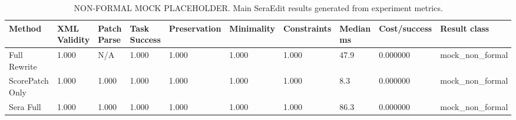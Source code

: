 \begin{table}[t]
\centering
\caption{NON-FORMAL MOCK PLACEHOLDER. Main SeraEdit results generated from experiment metrics.}
\small
\begin{tabular}{llllllllll}
\hline
Method & XML Validity & Patch Parse & Task Success & Preservation & Minimality & Constraints & Median ms & Cost/success & Result class \\
\hline
Full Rewrite & 1.000 & N/A & 1.000 & 1.000 & 1.000 & 1.000 & 47.9 & 0.000000 & mock\_non\_formal \\
ScorePatch Only & 1.000 & 1.000 & 1.000 & 1.000 & 1.000 & 1.000 & 8.3 & 0.000000 & mock\_non\_formal \\
Sera Full & 1.000 & 1.000 & 1.000 & 1.000 & 1.000 & 1.000 & 86.3 & 0.000000 & mock\_non\_formal \\
\hline
\end{tabular}
\end{table}
